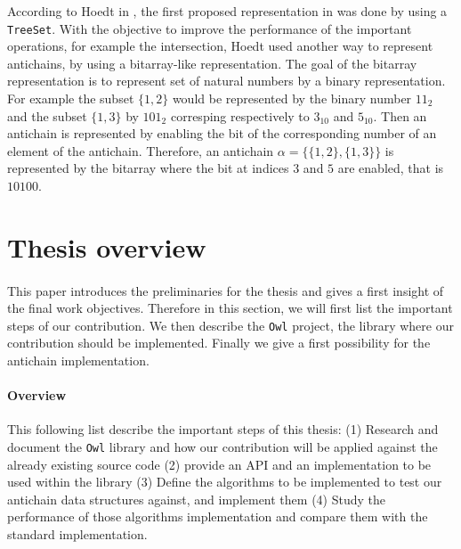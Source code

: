 \documentclass[11pt,a4paper]{article}
\theoremstyle{definition}
\begin{document}
According to Hoedt in
\cite{hoedt}, the first proposed representation
in \cite{causemaecker1} was done by using
a \texttt{TreeSet}. With the objective to improve the performance of
the important operations, for example the intersection, Hoedt used
another way to represent antichains, by using a bitarray-like representation.
The goal of the bitarray representation is to represent set of natural numbers
by a binary representation. For example the subset $\{1, 2\}$ would be
represented by the binary number $11_2$ and the subset $\{1, 3\}$
by $101_2$ corresping respectively to $3_{10}$ and $5_{10}$. Then an antichain
is represented by enabling the bit of the corresponding number of an element
of the antichain. Therefore, an antichain $\alpha = \{\{1, 2\}, \{1, 3\}\}$
is represented by the bitarray  where the bit at indices $3$ and $5$
are enabled, that is $10100$.

\newpage

\section{Thesis overview}

\label{conclusion}

\paragraph{}

This paper introduces the preliminaries for the thesis
and gives a first insight of the final
work objectives. Therefore in this section,
we will first list the important steps of our contribution.
We then describe
the \texttt{Owl} project, the library where our contribution should
be implemented. Finally we give a first possibility for the
antichain implementation.

\paragraph{Overview}

This following list describe the important
steps of this thesis: (1) Research and document
the \texttt{Owl} library and how our contribution will be applied
against the already existing source code
(2) provide an API and an implementation to be used within
the library
(3) Define the algorithms to be implemented to test our antichain
data structures against, and implement them (4) Study the performance
of those algorithms implementation
and compare them with the standard implementation.
\end{document}
